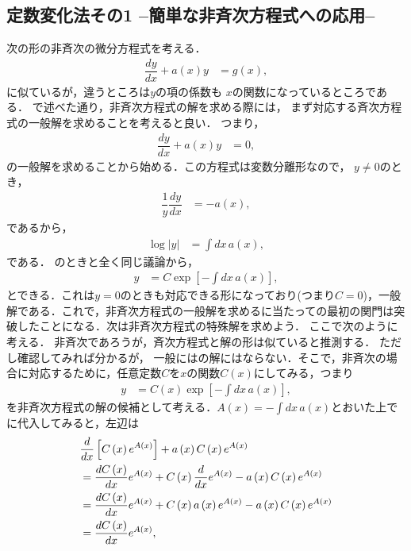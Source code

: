 \subsection{定数変化法その1 –簡単な非斉次方程式への応用–}
%
次の形の非斉次の微分方程式を考える．
\begin{align}
 \dfrac{dy}{dx}+a\left(x\right)y & =g\left(x\right), \label{eq:PDE_06}
\end{align}
%
に似ているが，違うところは$y$の項の係数も
$x$の関数になっているところである．
で述べた通り，非斉次方程式の解を求める際には，
まず対応する斉次方程式の一般解を求めることを考えると良い．
つまり，
\begin{align}
 \dfrac{dy}{dx}+a\left(x\right)y & = 0,
\end{align}
の一般解を求めることから始める．この方程式は変数分離形なので，
$y\neq 0$のとき，
\begin{align}
 \dfrac{1}{y}\dfrac{dy}{dx} & =-a\left(x\right),
\end{align}
であるから，
\begin{align}
 \log\left|y\right| & =\int dx\,a\left(x\right),
\end{align}
である．
のときと全く同じ議論から，
\begin{align}
 y & =C\exp\left[-\int dx\,a\left(x\right)\right], \label{eq:PDE_06_homo_sol}
\end{align}
とできる．これは$y=0$のときも対応できる形になっており(つまり$C=0$)，一般解である．これで，非斉次方程式の一般解を求めるに当たっての最初の関門は突破したことになる．次は非斉次方程式の特殊解を求めよう．
ここで次のように考える．
非斉次であろうが，斉次方程式と解の形は似ていると推測する．
ただし確認してみれば分かるが，
一般にはの解にはならない．そこで，非斉次の場合に対応するために，任意定数$C$を$x$の関数$C\left(x\right)$にしてみる，つまり
\begin{align}
 y & =C\left(x\right)\exp\left[-\int dx\,a\left(x\right)\right],
\end{align}
を非斉次方程式の解の候補として考える．$A\left(x\right) = -\int dx\,a\left(x\right)$とおいた上でに代入してみると，左辺は
\begin{align}
 & \dfrac{d}{dx}\left[C\left(x\right)e^{A\left(x\right)}\right]+a\left(x\right)C\left(x\right)e^{A\left(x\right)}\notag\\
 & =\dfrac{dC\left(x\right)}{dx}e^{A\left(x\right)}+C\left(x\right)\dfrac{d}{dx}e^{A\left(x\right)}-a\left(x\right)C\left(x\right)e^{A\left(x\right)}\notag\\
 & =\dfrac{dC\left(x\right)}{dx}e^{A\left(x\right)}+C\left(x\right)a\left(x\right)e^{A\left(x\right)}-a\left(x\right)C\left(x\right)e^{A\left(x\right)}\notag\\
 & =\dfrac{dC\left(x\right)}{dx}e^{A\left(x\right)},
\end{align}
